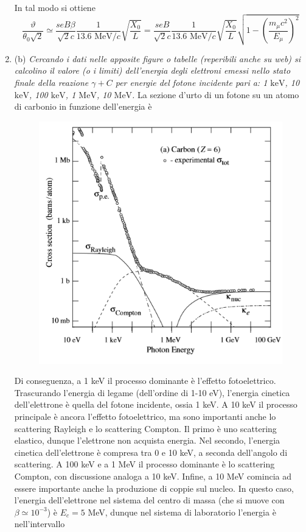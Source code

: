 \documentclass{article}
\renewcommand{\b}{(b)}
\renewcommand{\t}[1]{\textit{ #1}}
\begin{document}
\begin{enumerate}
		In tal modo si ottiene
		\[\frac{\vartheta}{\theta_0\sqrt{2}}\simeq\frac{seB\beta}{\sqrt{2}c}\frac{1}{13.6\textrm{ MeV/}c}\sqrt{\frac{X_0}{L}}=\frac{seB}{\sqrt{2}c}\frac{1}{13.6\textrm{ MeV/}c}\sqrt{\frac{X_0}{L}}\sqrt{1-\left(\frac{m_\mu c^2}{E_\mu}\right)^2}\]
	\item\b\t{Cercando i dati nelle apposite figure o tabelle (reperibili anche su web) si
		calcolino il valore (o i limiti) dell'energia degli elettroni emessi nello stato finale
		della reazione $\gamma+C$ per energie del fotone incidente pari a: 1 $\mathrm{keV}$, 10 $\mathrm{keV}$, 100 $\mathrm{keV}$,
			1 $\mathrm{MeV}$, 10 $\mathrm{MeV}$.} La sezione d'urto di un fotone su un atomo di carbonio in funzione dell'energia è
		\begin{figure}[h!]
			\centering
			\includegraphics[scale=1]{carbonio.png}
		\end{figure}
	\newpage
	\noindent Di conseguenza, a 1 keV il processo dominante è l'effetto fotoelettrico. Trascurando l'energia di legame (dell'ordine di 1-10 eV), l'energia cinetica dell'elettrone è quella del fotone incidente, ossia 1 keV. A 10 keV il processo principale è ancora l'effetto fotoelettrico, ma sono importanti anche lo scattering Rayleigh e lo scattering Compton. Il primo è uno scattering elastico, dunque l'elettrone non acquista energia. Nel secondo, l'energia cinetica dell'elettrone è compresa tra 0 e 10 keV, a seconda dell'angolo di scattering. A 100 keV e a 1 MeV il processo dominante è lo scattering Compton, con discussione analoga a 10 keV. Infine, a 10 MeV comincia ad essere importante anche la produzione di coppie sul nucleo. In questo caso, l'energia dell'elettrone nel sistema del centro di massa (che si muove con $\beta\simeq10^{-3}$) è $E_c=5$ MeV, dunque nel sistema di laboratorio l'energia è nell'intervallo

\end{enumerate}
\end{document}

